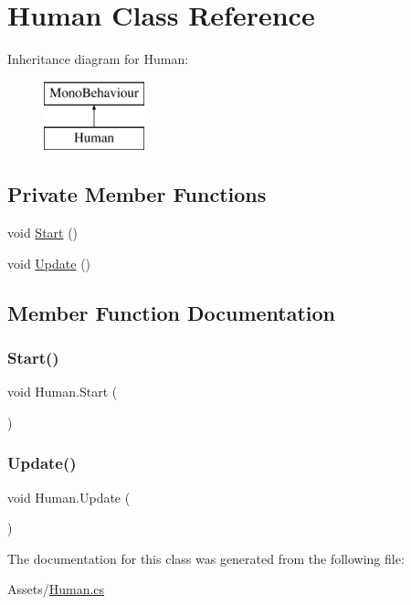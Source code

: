 \hypertarget{class_human}{}\section{Human Class Reference}
\label{class_human}
Inheritance diagram for Human\+:\begin{figure}[H]
\begin{center}
\leavevmode
\includegraphics[height=2.000000cm]{class_human}
\end{center}
\end{figure}
\subsection*{Private Member Functions}
\begin{DoxyCompactItemize}
\item 
void \hyperlink{class_human_ad90a5e6e13a58f4340825d16a75afcf6}{Start} ()
\item 
void \hyperlink{class_human_a615b9b36e637a70156b748fc56c64b84}{Update} ()
\end{DoxyCompactItemize}


\subsection{Member Function Documentation}
\mbox{\label{class_human_ad90a5e6e13a58f4340825d16a75afcf6}} 
\subsubsection{\texorpdfstring{Start()}{Start()}}
{\footnotesize\ttfamily void Human.\+Start (\begin{DoxyParamCaption}{ }\end{DoxyParamCaption})\hspace{0.3cm}{\ttfamily [private]}}

\mbox{\label{class_human_a615b9b36e637a70156b748fc56c64b84}} 
\subsubsection{\texorpdfstring{Update()}{Update()}}
{\footnotesize\ttfamily void Human.\+Update (\begin{DoxyParamCaption}{ }\end{DoxyParamCaption})\hspace{0.3cm}{\ttfamily [private]}}



The documentation for this class was generated from the following file\+:\begin{DoxyCompactItemize}
\item 
Assets/\hyperlink{_human_8cs}{Human.\+cs}\end{DoxyCompactItemize}
